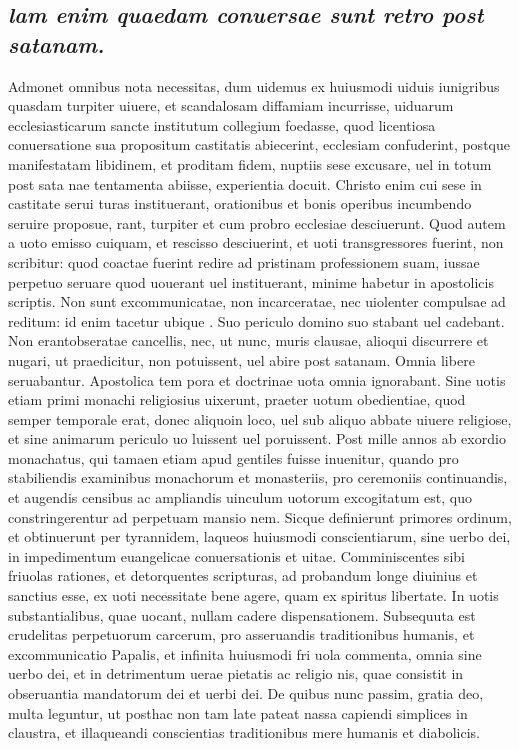 \documentclass{article}
\begin{document}
\begin{pages}
\subsection*{\textit{lam enim quaedam conuersae sunt retro post satanam. }}\pstart Admonet omnibus nota necessitas, dum uidemus ex huiusmodi uiduis iunigribus quasdam turpiter uiuere, et scandalosam diffamiam incurrisse, uiduarum ecclesiasticarum sancte institutum collegium foedasse, quod licentiosa conuersatione sua propositum castitatis abiecerint, ecclesiam confuderint, postque manifestatam libidinem, et proditam fidem, nuptiis sese excusare, uel in totum post sata nae tentamenta abiisse, experientia docuit. Christo enim cui sese in castitate serui turas instituerant, orationibus et bonis operibus incumbendo seruire proposue, rant, turpiter et cum probro ecclesiae desciuerunt. Quod autem a uoto emisso cuiquam, et rescisso desciuerint, et uoti transgressores fuerint, non scribitur: quod coactae fuerint redire ad pristinam professionem suam, iussae perpetuo seruare quod uouerant uel instituerant, minime habetur in apostolicis scriptis. Non sunt excommunicatae, non incarceratae, nec uiolenter compulsae ad reditum: id enim tacetur ubique . Suo periculo domino suo stabant uel cadebant. Non erantobseratae cancellis, nec, ut nunc, muris clausae, alioqui discurrere et nugari, ut praedicitur, non potuissent, uel abire post satanam. Omnia libere seruabantur. Apostolica tem pora et doctrinae uota omnia ignorabant. Sine uotis etiam primi monachi religiosius uixerunt, praeter uotum obedientiae, quod semper temporale erat, donec aliquoin loco, uel sub aliquo abbate uiuere religiose, et sine animarum periculo uo luissent uel poruissent. Post mille annos ab exordio monachatus, qui tamaen etiam apud gentiles fuisse inuenitur, quando pro stabiliendis examinibus monachorum et monasteriis, pro ceremoniis continuandis, et augendis censibus ac ampliandis uinculum uotorum excogitatum est, quo constringerentur ad perpetuam mansio nem. Sicque definierunt primores ordinum, et obtinuerunt per tyrannidem, laqueos huiusmodi conscientiarum, sine uerbo dei, in impedimentum euangelicae conuersationis et uitae. Comminiscentes sibi friuolas rationes, et detorquentes scripturas, ad probandum longe diuinius et sanctius esse, ex uoti necessitate bene agere, quam ex spiritus libertate. In uotis substantialibus, quae uocant, nullam cadere dispensationem. Subsequuta est crudelitas perpetuorum carcerum, pro asseruandis traditionibus humanis, et excommunicatio Papalis, et infinita huiusmodi fri uola commenta, omnia sine uerbo dei, et in detrimentum uerae pietatis ac religio nis, quae consistit in obseruantia mandatorum dei et uerbi dei. De quibus nunc passim, gratia deo, multa leguntur, ut posthac non tam late pateat nassa capiendi simplices in claustra, et illaqueandi conscientias traditionibus mere humanis et diabolicis.  \pend
{}
{}

\end{pages}
\end{document}
